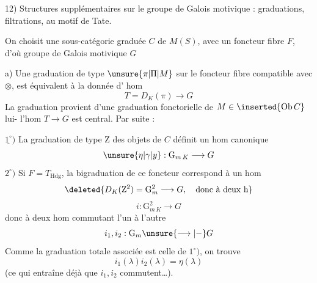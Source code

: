 12) Structures supplémentaires sur le groupe de Galois motivique :  graduations, filtrations, au motif de Tate.

 On choisit une sous-\inserted{$\otimes$-}catégorie graduée $C$ de $M(S)$, avec un foncteur fibre $F$, d'où groupe de Galois motivique $G$

a) Une graduation de type $\unsure{\pi|\Pi|M}$ sur le foncteur fibre  compatible avec $\otimes$, est équivalent à la donnée d' hom
\[
T=D_K(\pi)\longrightarrow G
\]
La graduation provient d'une graduation fonctorielle de $M\in\inserted{\operatorname{Ob}C}$ lui-  l'hom $T\longrightarrow G$ est central. Par suite :

$\underline{1^\circ})$ La graduation  de type $\mathrm Z$ des objets de $C$ définit un hom canonique
\[
\unsure{\eta|\gamma|y}:\mathrm{G}_{m\,K}\longrightarrow G
\]
$2^\circ)$ Si $F=T_{\mathrm{Hdg}}$, la bigraduation de ce foncteur correspond à un hom
\[
\deleted{D_K(\mathrm Z^2)=\mathrm G_m^2\longrightarrow G,\quad\text{donc à deux h}}
\]
\[
i:\mathrm G_{m\,K}^2\longrightarrow G
\]
donc à deux hom commutant l'un à l'autre
\[
i_1,i_2:\mathrm G_m\unsure{\longrightarrow|-}G
\]
Comme la graduation totale associée est celle de $1^\circ)$, on trouve
\[
i_1(\lambda)i_2(\lambda)=\eta(\lambda)
\]
(ce qui entraîne déjà que $i_1,i_2$ commutent\ldots).


